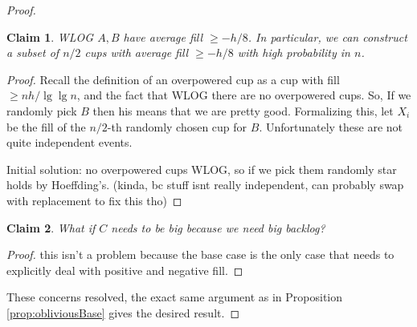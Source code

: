 \documentclass[twocolumn]{article}[10pt]
\newtheorem{clm}{Claim}
\begin{document}
\begin{proof}
{\begin{clm}
  WLOG $A,B$ have average fill $\ge -h/8$.
  In particular, we can construct a subset of $n/2$
  cups with average fill $\ge -h/8$ with high probability in $n$. 
\end{clm}
\begin{proof}

  Recall the definition of an overpowered cup as a cup with fill $\ge nh / \lg \lg n$,
  and the fact that WLOG there are no overpowered cups.
  So, If we randomly pick $B$ then his means that we are pretty good. 
  Formalizing this, let $X_i$ be the fill of the $n/2$-th randomly chosen cup
  for $B$. Unfortunately these are not quite independent events.

  Initial solution: no overpowered cups WLOG, so if we pick them randomly star holds
  by Hoeffding's. (kinda, bc stuff isnt really independent, can probably swap
  with replacement to fix this tho)
  
\end{proof}
\begin{clm}
  What if $C$ needs to be big because we need big backlog? 
\end{clm}
\begin{proof}
 this isn't a problem because the base case is the only case that needs to
 explicitly deal with positive and negative fill.
\end{proof}
These concerns resolved, the exact same argument as in Proposition
\ref{prop:obliviousBase} gives the desired result.
}
\end{proof}
\end{document}
